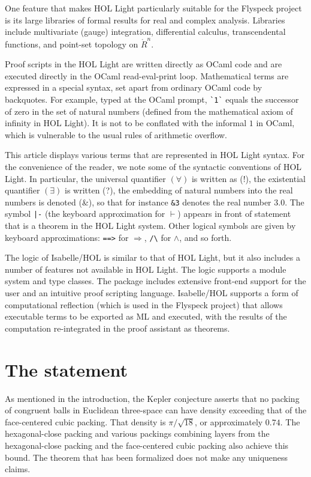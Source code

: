 One feature that makes HOL Light particularly suitable for the
Flyspeck project is its large libraries of formal results for real and
complex analysis.  Libraries include multivariate (gauge) integration,
differential calculus, transcendental functions, and point-set
topology on $\ring{R}^n$.

Proof scripts in the HOL Light are written directly as OCaml code and
are executed directly in the OCaml read-eval-print loop.  Mathematical
terms are expressed in a special syntax, set apart from ordinary OCaml
code by backquotes.  For example, typed at the OCaml prompt,
\verb!`1`!  equals the successor of zero in the set of natural numbers
(defined from the mathematical axiom of infinity in HOL Light).
It is not to be conflated with the informal $1$ in OCaml, which is
vulnerable to the usual rules of arithmetic overflow.

This article displays various terms that are represented in HOL Light
syntax.  For the convenience of the reader, we note some of the
syntactic conventions of HOL Light.  In particular, the universal
quantifier $(\forall)$ is written as (!), the existential quantifier
$(\exists)$ is written (?), the embedding of natural numbers into the
real numbers is denoted (\&), so that for instance \verb!&3! denotes
the real number $3.0$.  The symbol \verb!|-! (the keyboard
approximation for $\vdash$) appears in front of statement that is a
theorem in the HOL Light system.  Other logical symbols are given by
keyboard approximations: \verb!==>! for $\Longrightarrow$, \verb!/\!
for $\land$, and so forth.

The logic of Isabelle/HOL is similar to that of HOL Light, but it
also includes a number of features not available in HOL Light.  The logic
supports a module system and type classes.  The package includes
extensive front-end support for the user and an intuitive proof
scripting language.  Isabelle/HOL supports a form of computational
reflection (which is used in the Flyspeck project) that allows
executable terms to be exported as ML and executed, with the results
of the computation re-integrated in the proof assistant as theorems.


\section{The statement}\label{sec:statement}

As mentioned in the introduction, the Kepler conjecture asserts that
no packing of congruent balls in Euclidean three-space can have
density exceeding that of the face-centered cubic packing.  That
density is $\pi/\sqrt{18}$, or approximately $0.74$.  The
hexagonal-close packing and various packings combining layers from the
hexagonal-close packing and the face-centered cubic packing also
achieve this bound.  The theorem that has been formalized does not
make any uniqueness claims.

